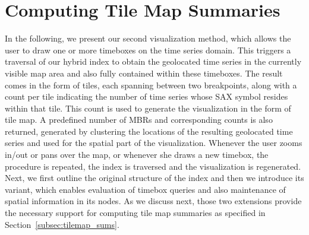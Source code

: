 
\section{Computing Tile Map Summaries}
\label{sec:tilemap_summary}

\graphicspath{{Papers/ElsevierBigDataResearch/}}

In the following, we present our second visualization method, which allows the user to draw one or more timeboxes on the time series domain. This triggers a traversal of our hybrid \hisax index to obtain the geolocated time series in the currently visible map area and also fully contained within these timeboxes. The result comes in the form of tiles, each spanning between two \isax breakpoints, along with a count per tile indicating the number of time series whose SAX symbol resides within that tile. This count is used to generate the visualization in the form of tile map. A predefined number of MBRs and corresponding counts is also returned, generated by clustering the locations of the resulting geolocated time series and used for the spatial part of the visualization. Whenever the user zooms in/out or pans over the map, or whenever she draws a new timebox, the procedure is repeated, the index is traversed and the visualization is regenerated. Next, we first outline the original structure of the \isax index and then we introduce its \hisax variant, which enables evaluation of timebox queries and also maintenance of spatial information in its nodes. As we discuss next, those two extensions provide the necessary support for computing tile map summaries as specified in Section~\ref{subsec:tilemap_sums}.

